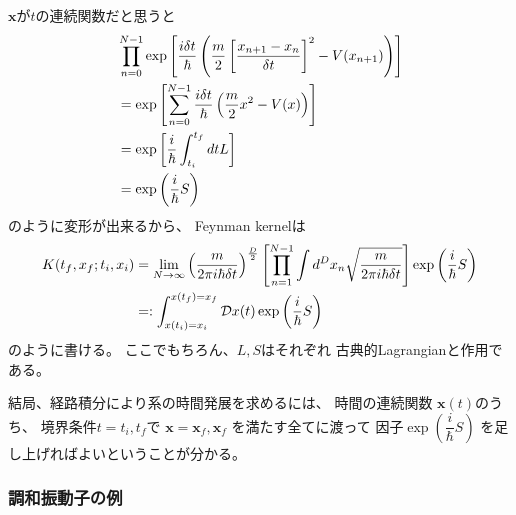 $\bm{x}$が$t$の連続関数だと思うと
\begin{align}
    &
    \prod_{n=0}^{N-1}
    \exp\left[
        \dfrac{ i \delta t }{\hbar}
        \left(
            \dfrac{m}{2}
            \left[
                \dfrac{
                    x_{n+1}
                -
                    x_{n}    
                }{\delta t}
            \right]^2
        -
            V( x_{n+1} )
        \right)
    \right]
\notag\\&=
    \exp\left[
        \sum_{n=0}^{N-1}
        \dfrac{ i \delta t }{\hbar}
        \left(
            \dfrac{m}{2}
            x^2
        -
            V( x )
        \right)
    \right]
\notag\\&=
    \exp\left[
        \dfrac{ i }{\hbar}
        \int_{t_i}^{t_f} dt
        L
    \right]
\notag\\&=
    \exp\left(\dfrac{i}{\hbar}S \right)
\end{align}
のように変形が出来るから、
Feynman kernelは
\begin{align}
    K( t_f, x_f ; t_i, x_i )
    &=
    \lim_{ N \to \infty }
    \left(
        \dfrac{m}{ 2 \pi i \hbar \delta t }
    \right)^{\frac{D}{2}}
    \left[
        \prod_{n=1}^{N-1}
        \int
        d^D x_n
        \sqrt{
            \dfrac{m}{2 \pi i \hbar \delta t}
        }
    \right]
    \exp\left(\dfrac{i}{\hbar}S \right)
\notag\\&
    =:
    \int_{x(t_i) = x_i}
        ^{x(t_f) = x_f}
        \mathcal{D} x(t)
    \exp\left(\dfrac{i}{\hbar}S \right)
\label{path integral representation of feynman kernel}
\end{align}
のように書ける。
ここでもちろん、$L, S$はそれぞれ
古典的Lagrangianと作用である。

結局、経路積分により系の時間発展を求めるには、
時間の連続関数
$\bm{x}(t)$のうち、
境界条件$t = t_i, t_f$で
$\bm{x} = \bm{x}_f, \bm{x}_f$
を満たす全てに渡って
因子$\exp\left(\dfrac{i}{\hbar}S \right)$
を足し上げればよいということが分かる。

\subsubsection{調和振動子の例}
\label{classical analysis of harmonic oscillator}

